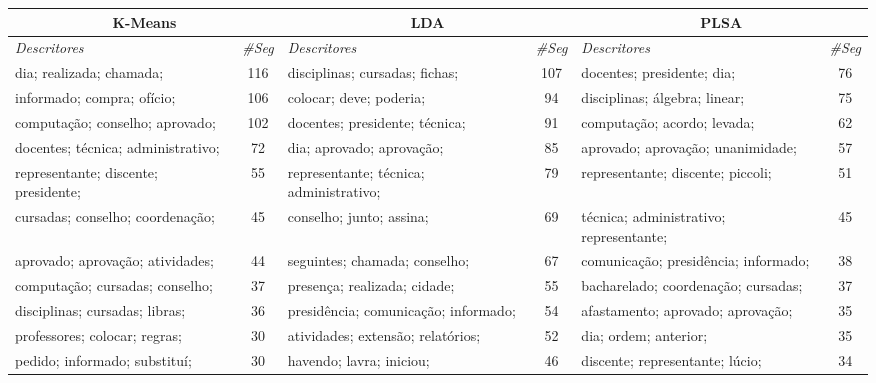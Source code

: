 
\begin{table}[!h]
\tiny
	\centering
	\begin{tabular}{|l|c||l|c||l|c|} \hline

		\multicolumn{2}{|c||}{ \textbf{K-Means} } & \multicolumn{2}{c||}{ \textbf{LDA} } & \multicolumn{2}{c|}{ \textbf{PLSA} } \\ \hline
		\textit{Descritores} & \textit{\#Seg} & \textit{Descritores} & \textit{\#Seg} & \textit{Descritores} & \textit{\#Seg} \\ \hline
\hline
   dia; realizada; chamada; &   116  &         disciplinas; cursadas; fichas; &   107  &       docentes; presidente; dia; &   76   \\ \hline
   informado; compra; ofício; &   106  &         colocar; deve; poderia; &   94  &       disciplinas; álgebra; linear; &   75  \\ \hline
   computação; conselho; aprovado; &   102  &         docentes; presidente; técnica; &   91  &       computação; acordo; levada; &   62  \\ \hline
   docentes; técnica; administrativo; &   72  &         dia; aprovado; aprovação; &   85  &       aprovado; aprovação; unanimidade; &   57  \\ \hline
   representante; discente; presidente; &   55  &         representante; técnica; administrativo; &   79  &       representante; discente; piccoli; &   51  \\ \hline
   cursadas; conselho; coordenação; &   45  &         conselho; junto; assina; &   69  &       técnica; administrativo; representante; &   45  \\ \hline
   aprovado; aprovação; atividades; &   44  &         seguintes; chamada; conselho; &   67  &       comunicação; presidência; informado; &   38  \\ \hline
   computação; cursadas; conselho; &   37  &         presença; realizada; cidade; &   55  &       bacharelado; coordenação; cursadas; &   37  \\ \hline
   disciplinas; cursadas; libras; &   36  &         presidência; comunicação; informado; &   54  &       afastamento; aprovado; aprovação; &   35  \\ \hline
   professores; colocar; regras; &   30  &         atividades; extensão; relatórios; &   52  &       dia; ordem; anterior; &   35  \\ \hline
   pedido; informado; substituí; &   30  &         havendo; lavra; iniciou; &   46  &       discente; representante; lúcio; &   34  \\ \hline

\end{tabular}
\end{table}
